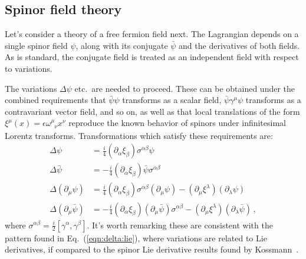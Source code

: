 \documentclass[prd,preprint,
  showpacs,showkeys,lengthcheck,
  nofootinbib,tightenlines,onecolumn,notitlepage,
  preprintnumbers,superscriptaddress]{revtex4-1}
\newcommand{\dx}{\ensuremath{\xi}}
\begin{document}

\subsection{Spinor field theory}

Let's consider a theory of a free fermion field next.
The Lagrangian depends on a single spinor field $\psi$,
along with its conjugate $\bar\psi$ and the derivatives of both fields.
As is standard, the conjugate field is treated as an independent field
with respect to variations.

The variations $\Delta \psi$ etc.\ are needed to proceed.
These can be obtained under the combined requirements that
$\bar\psi \psi$ transforms as a scalar field,
$\bar\psi \gamma^\mu \psi$ transforms as a contravariant vector field, and so on,
as well as that local translations of the form
$\dx^\mu(x) = \epsilon\omega^{\mu}_{\phantom{\mu}\nu}x^\nu$
reproduce the known behavior of spinors under infinitesimal
Lorentz transforms.
Transformations which satisfy these requirements are:
\begin{subequations}
  \label{eqn:variations:spinor}
  \begin{align}
    \Delta \psi
    &=
    \frac{i}{4}
    (\partial_\alpha \dx_\beta)
    \sigma^{\alpha\beta}
    \psi
    \\
    \Delta \bar\psi
    &=
    -
    \frac{i}{4}
    (\partial_\alpha \dx_\beta)
    \bar\psi
    \sigma^{\alpha\beta}
    \\
    \Delta (\partial_\mu\psi)
    &=
    \frac{i}{4}
    (\partial_\alpha \dx_\beta)
    \sigma^{\alpha\beta}
    (\partial_\mu \psi)
    -
    (\partial_\mu \dx^\lambda)
    (\partial_\lambda \psi)
    \\
    \Delta (\partial_\mu \bar\psi)
    &=
    -
    \frac{i}{4}
    (\partial_\alpha \dx_\beta)
    (\partial_\mu \bar\psi)
    \sigma^{\alpha\beta}
    -
    (\partial_\mu \dx^\lambda)
    (\partial_\lambda \bar\psi)
    \,,
  \end{align}
\end{subequations}
where $\sigma^{\alpha\beta} = \frac{i}{2}[\gamma^\alpha,\gamma^\beta]$.
It's worth remarking these are consistent with the pattern
found in Eq.~(\ref{eqn:delta:lie}),
where variations are related to Lie derivatives,
if compared to the spinor Lie derivative results
found by Kossmann~\cite{Kosmann:1971}.
\end{document}
